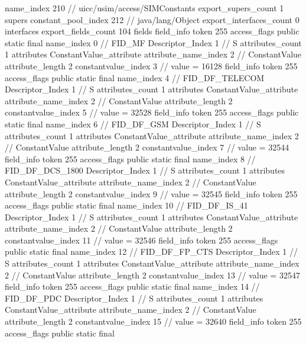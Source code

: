 {{{			name_index	210		// uicc/usim/access/SIMConstants
			export_supers_count	1
			supers {
				constant_pool_index	212		// java/lang/Object
			}
			export_interfaces_count	0
			interfaces {
			}
			export_fields_count	104
			fields {
			field_info {
				token	255
				access_flags	public static final
				name_index	0		// FID_MF
				Descriptor_Index	1		// S
				attributes_count	1
				attributes {
				ConstantValue_attribute {
					attribute_name_index	2		// ConstantValue
					attribute_length	2
					constantvalue_index	3		// value = 16128
				}
				}
			}
			field_info {
				token	255
				access_flags	public static final
				name_index	4		// FID_DF_TELECOM
				Descriptor_Index	1		// S
				attributes_count	1
				attributes {
				ConstantValue_attribute {
					attribute_name_index	2		// ConstantValue
					attribute_length	2
					constantvalue_index	5		// value = 32528
				}
				}
			}
			field_info {
				token	255
				access_flags	public static final
				name_index	6		// FID_DF_GSM
				Descriptor_Index	1		// S
				attributes_count	1
				attributes {
				ConstantValue_attribute {
					attribute_name_index	2		// ConstantValue
					attribute_length	2
					constantvalue_index	7		// value = 32544
				}
				}
			}
			field_info {
				token	255
				access_flags	public static final
				name_index	8		// FID_DF_DCS_1800
				Descriptor_Index	1		// S
				attributes_count	1
				attributes {
				ConstantValue_attribute {
					attribute_name_index	2		// ConstantValue
					attribute_length	2
					constantvalue_index	9		// value = 32545
				}
				}
			}
			field_info {
				token	255
				access_flags	public static final
				name_index	10		// FID_DF_IS_41
				Descriptor_Index	1		// S
				attributes_count	1
				attributes {
				ConstantValue_attribute {
					attribute_name_index	2		// ConstantValue
					attribute_length	2
					constantvalue_index	11		// value = 32546
				}
				}
			}
			field_info {
				token	255
				access_flags	public static final
				name_index	12		// FID_DF_FP_CTS
				Descriptor_Index	1		// S
				attributes_count	1
				attributes {
				ConstantValue_attribute {
					attribute_name_index	2		// ConstantValue
					attribute_length	2
					constantvalue_index	13		// value = 32547
				}
				}
			}
			field_info {
				token	255
				access_flags	public static final
				name_index	14		// FID_DF_PDC
				Descriptor_Index	1		// S
				attributes_count	1
				attributes {
				ConstantValue_attribute {
					attribute_name_index	2		// ConstantValue
					attribute_length	2
					constantvalue_index	15		// value = 32640
				}
				}
			}
			field_info {
				token	255
				access_flags	public static final
}}}}}
